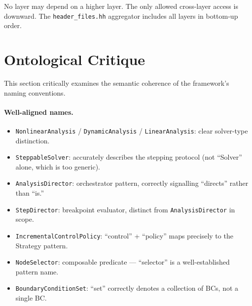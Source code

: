 No layer may depend on a higher layer.  The only allowed cross-layer
access is downward.  The \texttt{header\_files.hh} aggregator includes
all layers in bottom-up order.


\section{Ontological Critique}
\label{sec:arch:ontology}

This section critically examines the semantic coherence of the
framework's naming conventions.

\paragraph{Well-aligned names.}
\begin{itemize}[nosep]
  \item \texttt{NonlinearAnalysis} / \texttt{DynamicAnalysis} /
        \texttt{LinearAnalysis}: clear solver-type distinction.
  \item \texttt{SteppableSolver}: accurately describes the stepping
        protocol (not ``Solver'' alone, which is too generic).
  \item \texttt{AnalysisDirector}: orchestrator pattern, correctly
        signalling ``directs'' rather than ``is.''
  \item \texttt{StepDirector}: breakpoint evaluator, distinct from
        \texttt{AnalysisDirector} in scope.
  \item \texttt{IncrementalControlPolicy}: ``control'' + ``policy'' maps
        precisely to the Strategy pattern.
  \item \texttt{NodeSelector}: composable predicate --- ``selector'' is a
        well-established pattern name.
  \item \texttt{BoundaryConditionSet}: ``set'' correctly denotes a
        collection of BCs, not a single BC.
\end{itemize}

